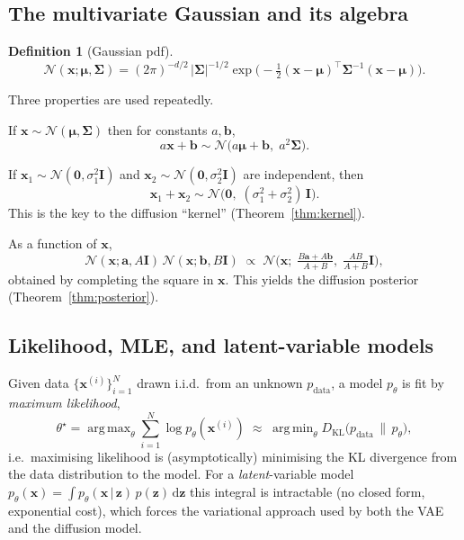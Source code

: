 \documentclass[12pt,a4paper]{article}
\theoremstyle{definition}
\newtheorem{definition}{Definition}
\theoremstyle{plain}
\newcommand{\N}{\mathcal{N}}
\newcommand{\KL}{D_{\mathrm{KL}}}
\newcommand{\x}{\bm{x}}
\newcommand{\z}{\bm{z}}
\newcommand{\II}{\mathbf{I}}
\newcommand{\given}{\,\vert\,}
\newcommand{\dd}{\,\mathrm{d}}
\DeclareMathOperator*{\argmin}{arg\,min}
\DeclareMathOperator*{\argmax}{arg\,max}
\begin{document}
\subsection{The multivariate Gaussian and its algebra}
\begin{definition}[Gaussian pdf]
\begin{equation}
\N(\x;\bm\mu,\bm\Sigma)=
(2\pi)^{-d/2}\,|\bm\Sigma|^{-1/2}
\exp\!\Big(-\tfrac12(\x-\bm\mu)^\top\bm\Sigma^{-1}(\x-\bm\mu)\Big).
\end{equation}
\end{definition}
Three properties are used repeatedly.
\begin{description}[leftmargin=1.4em,style=nextline]
\item[(G1) Affine maps.] If $\x\sim\N(\bm\mu,\bm\Sigma)$ then for constants $a,\bm b$,
\begin{equation}
a\x+\bm b \sim \N\!\big(a\bm\mu+\bm b,\;a^2\bm\Sigma\big).
\end{equation}
\item[(G2) Sum of independents.] If $\x_1\sim\N(\bm0,\sigma_1^2\II)$ and
$\x_2\sim\N(\bm0,\sigma_2^2\II)$ are independent, then
\begin{equation}
\x_1+\x_2\sim\N\!\big(\bm0,\;(\sigma_1^2+\sigma_2^2)\,\II\big).
\end{equation}
This is the key to the diffusion ``kernel'' (Theorem~\ref{thm:kernel}).
\item[(G3) Product of two Gaussian kernels.] As a function of $\x$,
\begin{equation}
\N(\x;\bm a,A\II)\,\N(\x;\bm b,B\II)\;\propto\;\N\!\Big(\x;\;
\tfrac{B\bm a+A\bm b}{A+B},\;\tfrac{AB}{A+B}\II\Big),
\end{equation}
obtained by completing the square in $\x$. This yields the diffusion posterior
(Theorem~\ref{thm:posterior}).
\end{description}

\subsection{Likelihood, MLE, and latent-variable models}
Given data $\{\x^{(i)}\}_{i=1}^N$ drawn i.i.d.\ from an unknown $p_{\mathrm{data}}$,
a model $p_\theta$ is fit by \emph{maximum likelihood},
\begin{equation}
\theta^\star=\argmax_\theta \sum_{i=1}^N \log p_\theta(\x^{(i)})
\;\approx\;\argmin_\theta \KL\!\big(p_{\mathrm{data}}\,\|\,p_\theta\big),
\end{equation}
i.e.\ maximising likelihood is (asymptotically) minimising the KL divergence from
the data distribution to the model. For a \emph{latent}-variable model
$p_\theta(\x)=\int p_\theta(\x\given\z)\,p(\z)\dd\z$ this integral is intractable
(no closed form, exponential cost), which forces the variational approach used by
both the VAE and the diffusion model.
\end{document}
